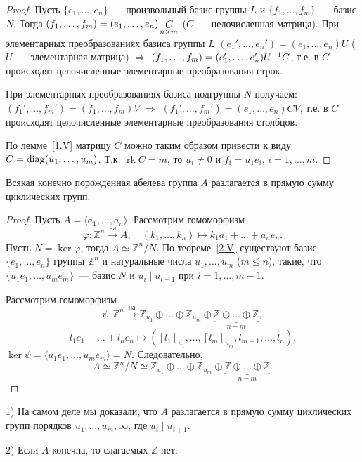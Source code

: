 \documentclass[a4paper]{article}
\newcommand{\rk}{\mathop{\mathrm{rk}}\nolimits}
\newcommand{\diag}{\mathop{\mathrm{diag}}\nolimits}
\newcommand*{\p}[1]{#1\nobreak\discretionary{}{\hbox{$\mathsurround=0pt #1$}}{}}
\begin{document}
\begin{proof}
Пусть $\{e_1,\ldots,e_n\}$~--- произвольный базис группы $L$ и
$\{f_1,\ldots,f_m\}$~--- базис $N$. Тогда
$(f_1,\ldots,f_m)\p=(e_1,\ldots,e_n)\mathop{C}\limits_{n\times m}$
($C$~--- целочисленная матрица). При элементарных преобразованиях
базиса группы $L$ $(e_1',\ldots,e_n')=(e_1,\ldots,e_n)U$ ($U$~---
элементарная матрица) $\Rightarrow$
$(f_1,\ldots,f_m)\p=(e_1',\ldots,e_n')U^{-1}C$, т.е. в $C$
происходят целочисленные элементарные преобразования строк.

При элементарных преобразованиях базиса подгруппы $N$ получаем:
$(f_1',\ldots,f_m')=(f_1,\ldots,f_m)V$ $\Rightarrow$
$(f_1',\ldots,f_m')=(e_1,\ldots,e_n)CV$, т.е. в $C$ происходят
целочисленные элементарные преобразования столбцов.

По лемме~\ref{1.V} матрицу $C$ можно таким образом привести к виду
$C\p=\diag(u_1,\ldots,u_m)$. Т.к. $\rk C=m$, то $u_i\neq 0$ и
$f_i=u_1e_i$, $i=1,\ldots,m$.
\end{proof}

\begin{theorem}
Всякая конечно порожденная абелева группа $A$ разлагается в прямую
сумму циклических групп.
\end{theorem}

\begin{proof}
Пусть $A=\langle a_1,\ldots,a_n\rangle$. Рассмотрим гомоморфизм
$$\varphi\colon \mathbb{Z}^n\stackrel{\text{на}}{\to}A,\quad
(k_1,\ldots,k_n)\mapsto k_1a_1+\ldots+a_ne_n.$$ Пусть $N=\ker
\varphi$, тогда $A\simeq \mathbb{Z}^n/N$. По теореме~\ref{2.V}
существуют базис $\{e_1,\ldots,e_n\}$ группы $\mathbb{Z}^n$ и
натуральные числа $u_1,\ldots,u_m$ ($m\leqslant n$), такие, что
$\{u_1e_1,\ldots,u_me_m\}$~--- базис $N$ и $u_i\mid u_{i+1}$ при
$i=1,\ldots,m-1$.

Рассмотрим гомоморфизм
$$\psi\colon\mathbb{Z}^n\stackrel{\text{на}}{\to}\mathbb{Z}_{u_1}
\oplus\ldots\oplus\mathbb{Z}_{u_m}\oplus\underbrace{\mathbb{Z}
\oplus\ldots\oplus\mathbb{Z}}_{n-m},$$ $$l_1e_1+\ldots+l_ne_n\mapsto
([l_1]_{u_1},\ldots,[l_m]_{u_m},l_{m+1},\ldots,l_n).$$
$\ker\psi=\langle u_1e_1,\ldots,u_me_m\rangle=N$. Следовательно,
$$A\simeq\mathbb{Z}^n/N\simeq\mathbb{Z}_{u_1}
\oplus\ldots\oplus\mathbb{Z}_{u_m}\oplus\underbrace{\mathbb{Z}
\oplus\ldots\oplus\mathbb{Z}}_{n-m}.$$
\end{proof}

\begin{zam}
1) На самом деле мы доказали, что $A$ разлагается в прямую сумму
циклических групп порядков $u_1,\ldots,u_m,\infty$, где $u_i\mid
u_{i+1}$.

2) Если $A$ конечна, то слагаемых $\mathbb{Z}$ нет.
\end{zam}
\end{document}
